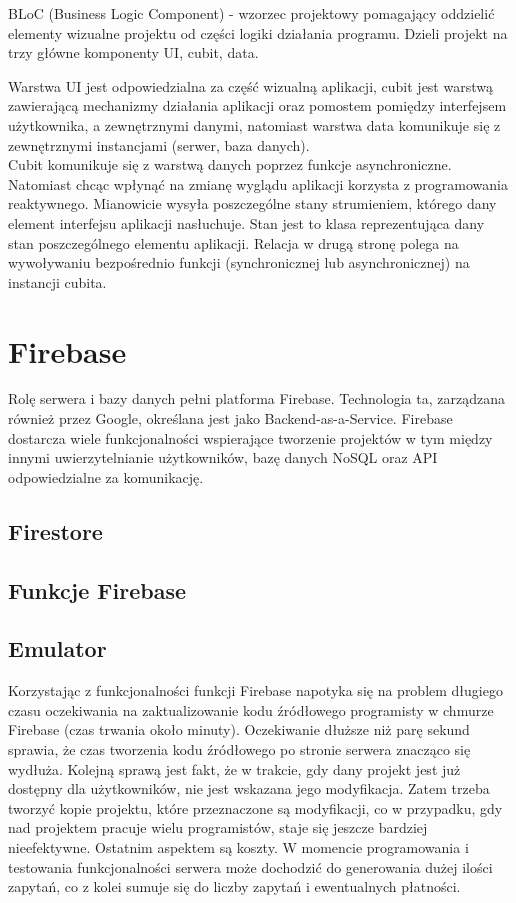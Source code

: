 BLoC (Business Logic Component) - wzorzec projektowy pomagający oddzielić elementy wizualne projektu od części logiki działania programu. Dzieli projekt na trzy główne komponenty UI, cubit, data.

Warstwa UI jest odpowiedzialna za część wizualną aplikacji, cubit jest warstwą zawierającą mechanizmy działania aplikacji oraz pomostem pomiędzy interfejsem użytkownika, a zewnętrznymi danymi, natomiast warstwa data komunikuje się z zewnętrznymi instancjami (serwer, baza danych).\\

Cubit komunikuje się z warstwą danych poprzez funkcje asynchroniczne. Natomiast chcąc wpłynąć na zmianę wyglądu aplikacji korzysta z programowania reaktywnego. Mianowicie wysyła poszczególne stany strumieniem, którego dany element interfejsu aplikacji nasłuchuje. Stan jest to klasa reprezentująca dany stan poszczególnego elementu aplikacji. Relacja w drugą stronę polega na wywoływaniu bezpośrednio funkcji (synchronicznej lub asynchronicznej) na instancji cubita.

\section{Firebase}

Rolę serwera i bazy danych pełni platforma Firebase. Technologia ta, zarządzana również przez Google, określana jest jako Backend-as-a-Service. Firebase dostarcza wiele funkcjonalności wspierające tworzenie projektów w tym między innymi uwierzytelnianie użytkowników, bazę danych NoSQL oraz API odpowiedzialne za komunikację.

\subsection{Firestore}

\subsection{Funkcje Firebase}

\subsection{Emulator}

Korzystając z funkcjonalności funkcji Firebase napotyka się na problem długiego czasu oczekiwania na zaktualizowanie kodu źródłowego programisty w chmurze Firebase (czas trwania około minuty). Oczekiwanie dłuższe niż parę sekund sprawia, że czas tworzenia kodu źródłowego po stronie serwera znacząco się wydłuża. Kolejną sprawą jest fakt, że w trakcie, gdy dany projekt jest już dostępny dla użytkowników, nie jest wskazana jego modyfikacja. Zatem trzeba tworzyć kopie projektu, które przeznaczone są modyfikacji, co w przypadku, gdy nad projektem pracuje wielu programistów, staje się jeszcze bardziej nieefektywne. Ostatnim aspektem są koszty. W momencie programowania i testowania funkcjonalności serwera może dochodzić do generowania dużej ilości zapytań, co z kolei sumuje się do liczby zapytań i ewentualnych płatności. \\

